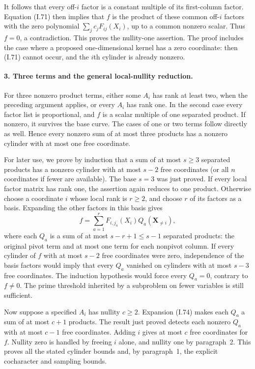 It follows that every off-$i$ factor is a constant multiple
of its first-column factor. Equation (I.71) then implies that
$f$ is the product of these common off-$i$ factors with the
zero polynomial $\sum_jc_jF_{ij}(X_i)$, up to a common
nonzero scalar. Thus $f=0$, a contradiction. This proves
the nullity-one assertion. The proof includes the case where
a proposed one-dimensional kernel has a zero coordinate:
then (I.71) cannot occur, and the $i$th cylinder is already
nonzero.

\paragraph{3. Three terms and the general local-nullity reduction.}
For three nonzero product terms, either some $A_i$ has rank
at least two, when the preceding argument applies, or every
$A_i$ has rank one. In the second case every factor list is
proportional, and $f$ is a scalar multiple of one separated
product. If nonzero, it survives the base curve. The cases
of one or two terms follow directly as well. Hence every
nonzero sum of at most three products has a nonzero cylinder
with at most one free coordinate.

For later use, we prove by induction that a sum of at most
$s\ge3$ separated products has a nonzero cylinder with at
most $s-2$ free coordinates (or all $n$ coordinates if fewer
are available). The base $s=3$ was just proved. If every
local factor matrix has rank one, the assertion again
reduces to one product. Otherwise choose a coordinate $i$
whose local rank is $r\ge2$, and choose $r$ of its factors
as a basis. Expanding the other factors in this basis gives
\[
 f=\sum_{a=1}^r F_{i,j_a}(X_i)Q_a(\mathbf X_{\ne i}),
 \tag{I.74}
\]
where each $Q_a$ is a sum of at most $s-r+1\le s-1$
separated products: the original pivot term and at most one
term for each nonpivot column. If every cylinder of $f$
with at most $s-2$ free coordinates were zero, independence
of the basis factors would imply that every $Q_a$ vanished
on cylinders with at most $s-3$ free coordinates. The
induction hypothesis would force every $Q_a=0$, contrary
to $f\ne0$. The prime threshold inherited by a subproblem
on fewer variables is still sufficient.

Now suppose a specified $A_i$ has nullity $c\ge2$.
Expansion (I.74) makes each $Q_a$ a sum of at most $c+1$
products. The result just proved detects each nonzero $Q_a$
with at most $c-1$ free coordinates. Adding $i$ gives at
most $c$ free coordinates for $f$. Nullity zero is handled
by freeing $i$ alone, and nullity one by paragraph~2. This
proves all the stated cylinder bounds and, by paragraph~1,
the explicit cocharacter and sampling bounds.

